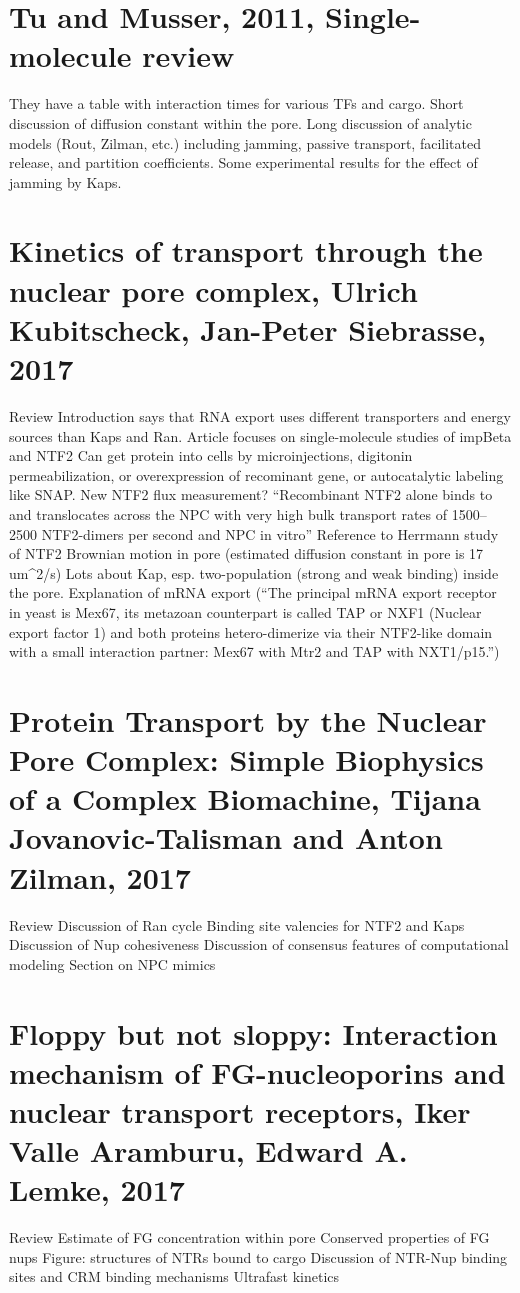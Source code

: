 \section{Tu and Musser, 2011, Single-molecule review}

They have a table with interaction times for various TFs and cargo.
Short discussion of diffusion constant within the pore.
Long discussion of analytic models (Rout, Zilman, etc.) including jamming, passive transport, facilitated release, and partition coefficients.
Some experimental results for the effect of jamming by Kaps.

\section{Kinetics of transport through the nuclear pore complex, Ulrich Kubitscheck, Jan-Peter Siebrasse, 2017}

Review
Introduction says that RNA export uses different transporters and energy sources than Kaps and Ran.
Article focuses on single-molecule studies of impBeta and NTF2
Can get protein into cells by microinjections, digitonin permeabilization, or overexpression of recominant gene, or autocatalytic labeling like SNAP.
New NTF2 flux measurement? ``Recombinant NTF2 alone binds to and translocates across the NPC with very high bulk transport rates of 1500–2500 NTF2-dimers per second and NPC in vitro''
Reference to Herrmann study of NTF2 Brownian motion in pore (estimated diffusion constant in pore is 17 um^2/s)
Lots about Kap, esp. two-population (strong and weak binding) inside the pore.
Explanation of mRNA export (``The principal mRNA export receptor in yeast is Mex67, its metazoan counterpart is called TAP or NXF1 (Nuclear export factor 1) and both proteins hetero-dimerize via their NTF2-like domain with a small interaction partner: Mex67 with Mtr2 and TAP with NXT1/p15.'')

\section{Protein Transport by the Nuclear Pore Complex: Simple Biophysics of a Complex Biomachine, Tijana Jovanovic-Talisman and Anton Zilman, 2017}

Review
Discussion of Ran cycle
Binding site valencies for NTF2 and Kaps
Discussion of Nup cohesiveness
Discussion of consensus features of computational modeling
Section on NPC mimics

\section{Floppy but not sloppy: Interaction mechanism of FG-nucleoporins and nuclear transport receptors, Iker Valle Aramburu, Edward A. Lemke, 2017}

Review
Estimate of FG concentration within pore
Conserved properties of FG nups
Figure: structures of NTRs bound to cargo
Discussion of NTR-Nup binding sites and CRM binding mechanisms
Ultrafast kinetics
















